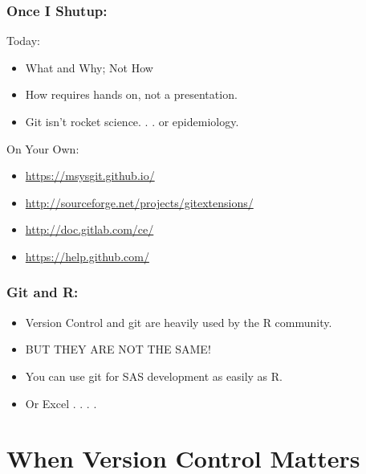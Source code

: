 \documentclass{beamer}
\begin{document}
\begin{frame}
  \frametitle{Once I Shutup:}

  Today:
  \begin{itemize}
  \item What and Why; Not How
  \item How requires hands on, not a presentation.
  \item Git isn't rocket science. . . or epidemiology.
  \end{itemize}

  \bigskip
  On Your Own:
  \begin{itemize}
  \item {\url{https://msysgit.github.io/}}
  \item {\url{http://sourceforge.net/projects/gitextensions/}}
  \item {\url{http://doc.gitlab.com/ce/}}
  \item {\url{https://help.github.com/}}
  \end{itemize}
  
\end{frame}

\begin{frame}
  \frametitle{Git and R:}  

  \begin{itemize}
  \item Version Control and git are heavily used by the R community.
  \item BUT THEY ARE NOT THE SAME!
  \item You can use git for SAS development as easily as R.
  \item Or Excel . . . . 
  \end{itemize}
\end{frame}

\section{When Version Control Matters} %
\end{document}
